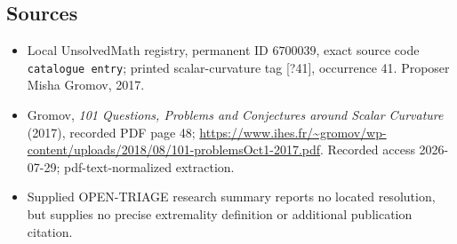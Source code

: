 \documentclass[11pt]{article}
\begin{document}
\subsection{Sources}
\begin{itemize}
\item Local UnsolvedMath registry, permanent ID \(6700039\), exact source code \texttt{catalogue entry}; printed scalar-curvature tag [?41], occurrence 41. Proposer Misha Gromov, 2017.
\item Gromov, \emph{101 Questions, Problems and Conjectures around Scalar Curvature} (2017), recorded PDF page 48; \url{https://www.ihes.fr/~gromov/wp-content/uploads/2018/08/101-problemsOct1-2017.pdf}. Recorded access 2026-07-29; pdf-text-normalized extraction.
\item Supplied OPEN-TRIAGE research summary reports no located resolution, but supplies no precise extremality definition or additional publication citation.
\end{itemize}
\end{document}
